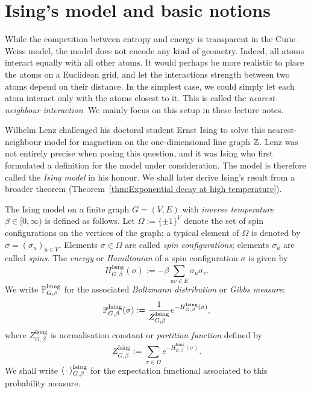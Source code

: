 \section{Ising's model and basic notions}
\label{sec:ising_1d}

While the competition between entropy and energy is transparent in the Curie--Weiss model,
the model does not encode any kind of geometry.
Indeed, all atoms interact equally with all other atoms.
It would perhaps be more realistic to place the atoms on a Euclidean grid,
and let the interactions strength between two atoms depend on their distance.
In the simplest case, we could simply let each atom interact only with the atoms
closest to it. This is called the \emph{nearest-neighbour interaction}.
We mainly focus on this setup in these lecture notes.

Wilhelm Lenz challenged his doctoral student Ernst Ising
to solve this nearest-neighbour model for magnetism on the one-dimensional line graph $\Z$.
Lenz was not entirely precise when posing this question,
and it was Ising who first formulated a definition for the model under consideration.
The model is therefore called the \emph{Ising model} in his honour.
We shall later derive Ising's result from a broader theorem (Theorem~\ref{thm:Exponential decay at high temperature}).

\begin{definition}
    \label{def:ising_finite}
    The Ising model on a finite graph \( G = (V, E) \) with \emph{inverse temperature} \( \beta \in [0,\infty) \) is defined as follows.
    Let $\Omega:=\{\pm1\}^V$ denote the set of spin configurations on the vertices of the graph;
    a typical element of $\Omega$ is denoted by $\sigma=(\sigma_u)_{u\in V}$.
    Elements $\sigma\in\Omega$ are called \emph{spin configurations};
    elements $\sigma_u$ are called \emph{spins}.
    The \emph{energy} or \emph{Hamiltonian} of a spin configuration $\sigma$ is given by
    \[
        H_{G,\beta}^{\operatorname{Ising}}(\sigma) := -\beta \sum_{uv \in E} \sigma_u \sigma_v.
    \]
    We write $\P_{G,\beta}^{\operatorname{Ising}}$ for the associated \emph{Boltzmann distribution} or \emph{Gibbs measure}:
    \[
        \P_{G,\beta}^{\operatorname{Ising}}(\sigma) := \frac{1}{Z_{G,\beta}^{\operatorname{Ising}}} e^{-H^{\operatorname{Ising}}_{G,\beta}(\sigma)},
    \]
    where \(Z_{G,\beta}^{\operatorname{Ising}}\) is normalisation constant or \emph{partition function} defined by
    \[
        Z_{G,\beta}^{\operatorname{Ising}}:= \sum_{\sigma\in\Omega} e^{-H^{\operatorname{Ising}}_{G,\beta}(\sigma)}.
    \]
    We shall write $\langle\blank\rangle_{G,\beta}^{\operatorname{Ising}}$ for the expectation functional associated to this probability measure.
\end{definition}

